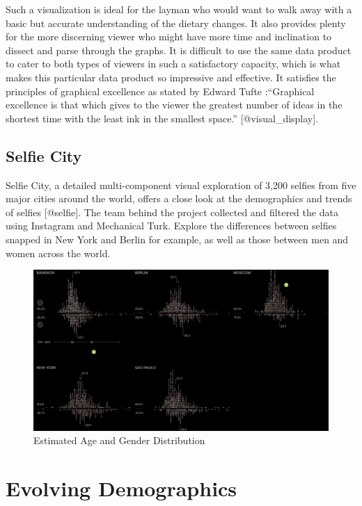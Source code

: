 \documentclass[]{book}
\theoremstyle{definition}
\theoremstyle{definition}
\theoremstyle{definition}
\theoremstyle{remark}
\begin{document}
Such a visualization is ideal for the layman who would want to walk away
with a basic but accurate understanding of the dietary changes. It also
provides plenty for the more discerning viewer who might have more time
and inclination to dissect and parse through the graphs. It is difficult
to use the same data product to cater to both types of viewers in such a
satisfactory capacity, which is what makes this particular data product
so impressive and effective. It satisfies the principles of graphical
excellence as stated by Edward Tufte :``Graphical excellence is that
which gives to the viewer the greatest number of ideas in the shortest
time with the least ink in the smallest space.'' {[}@visual\_display{]}.

\subsection{Selfie City}\label{selfie-city}

Selfie City, a detailed multi-component visual exploration of 3,200
selfies from five major cities around the world, offers a close look at
the demographics and trends of selfies {[}@selfie{]}. The team behind
the project collected and filtered the data using Instagram and
Mechanical Turk. Explore the differences between selfies snapped in New
York and Berlin for example, as well as those between men and women
across the world.

\begin{figure}
\centering
\includegraphics{images/selfie_age_gender.png}
\caption{Estimated Age and Gender Distribution}
\end{figure}

\section{Evolving Demographics}\label{evolving-demographics}
\end{document}
